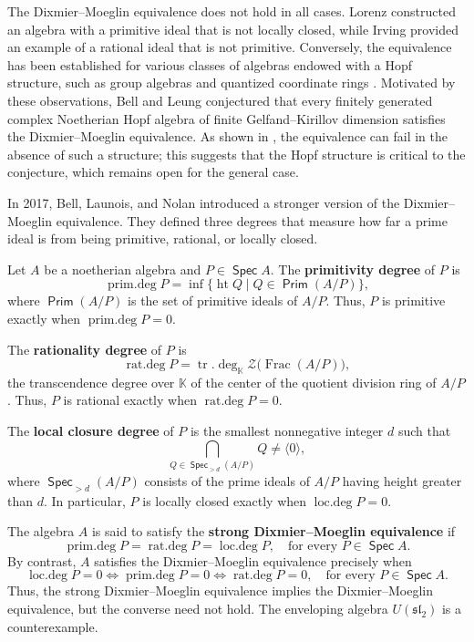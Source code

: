 \documentclass[11pt]{article}
\theoremstyle{definition}
\numberwithin{equation}{section}
\newcommand{\KK}{\mathbb{K}}
\newcommand{\cZ}{\mathcal{Z}}
\newcommand\fsl{\mathfrak{sl}}
\DeclareMathOperator{\gfrac}{\mathrm{Frac}}
\DeclareMathOperator{\heit}{\mathrm{ht}}
\DeclareMathOperator{\pdeg}{\mathrm{prim.deg}}
\DeclareMathOperator{\rdeg}{\mathrm{rat.deg}}
\DeclareMathOperator{\ldeg}{\mathrm{loc.deg}}
\DeclareMathOperator{\tr}{\mathrm{tr}}
\DeclareMathOperator{\spec}{\mathsf{Spec}}
\DeclareMathOperator{\Prim}{\mathsf{Prim}}
\begin{document}
The Dixmier--Moeglin equivalence does not hold in all cases. Lorenz \cite{LO77} constructed an algebra with a primitive ideal that is not locally closed, while Irving \cite{IR79} provided an example of a rational ideal that is not primitive. Conversely, the equivalence has been established for various classes of algebras endowed with a Hopf structure, such as group algebras \cite{ZA71} and quantized coordinate rings \cite{GL00}. Motivated by these observations, Bell and Leung \cite[Conjecture 1.3]{BLE14} conjectured that every finitely generated complex Noetherian Hopf algebra of finite Gelfand--Kirillov dimension satisfies the Dixmier--Moeglin equivalence. As shown in \cite{BLSM15}, the equivalence can fail in the absence of such a structure; this suggests that the Hopf structure is critical to the conjecture, which remains open for the general case.

In 2017, Bell, Launois, and Nolan \cite{BLN17} introduced a stronger version of the Dixmier--Moeglin equivalence. They defined three degrees that measure how far a prime ideal is from being primitive, rational, or locally closed.

Let $A$ be a noetherian algebra and $P\in\spec A$. The \textbf{primitivity degree} of $P$ is
$$\pdeg P=\inf\{\heit Q\mid Q\in\Prim(A/P)\},$$
where $\Prim(A/P)$ is the set of primitive ideals of $A/P$. Thus, $P$ is primitive exactly when $\pdeg P=0$.

The \textbf{rationality degree} of $P$ is
$$\rdeg P=\tr.\deg_{\KK}\cZ\bigl(\gfrac(A/P)\bigr),$$
the transcendence degree over $\KK$ of the center of the quotient division ring of $A/P$. Thus, $P$ is rational exactly when $\rdeg P=0$.

The \textbf{local closure degree} of $P$ is the smallest nonnegative integer $d$ such that
$$\bigcap_{Q\in\spec_{>d}(A/P)}Q\neq\langle 0\rangle,$$
where $\spec_{>d}(A/P)$ consists of the prime ideals of $A/P$ having height greater than $d$. 
In particular, $P$ is locally closed exactly when $\ldeg P=0$.

The algebra $A$ is said to satisfy the \textbf{strong Dixmier--Moeglin equivalence} if
$$\pdeg P=\rdeg P=\ldeg P,
\quad\text{for every }P\in\spec A.$$
By contrast, $A$ satisfies the Dixmier--Moeglin equivalence precisely when
$$\ldeg P=0\Leftrightarrow\pdeg P=0\Leftrightarrow\rdeg P=0,
\quad\text{for every }P\in\spec A.$$
Thus, the strong Dixmier--Moeglin equivalence implies the Dixmier--Moeglin equivalence, but the converse need not hold. The enveloping algebra $U(\fsl_2)$ is a counterexample.
\end{document}

